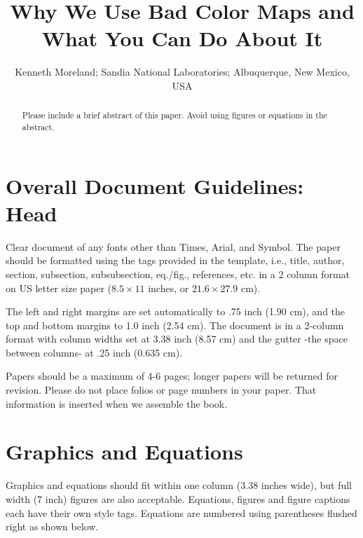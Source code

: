 \documentclass[letterpaper,twocolumn,fleqn]{article}
\title{Why We Use Bad Color Maps and What You Can Do About It}
\author{Kenneth Moreland; Sandia National Laboratories; Albuquerque, New
  Mexico, USA}
\date{} %
\begin{document}
 

\maketitle 

\thispagestyle{empty} %


\begin{abstract}
Please include a brief abstract of this paper. Avoid using figures or
equations in the abstract.
\end{abstract}


\section{Overall Document Guidelines: Head}
\label{sec:intro}

Clear document of any fonts other than Times, Arial, and Symbol. The
paper should be formatted using the tags provided in the template,
i.e., title, author, section, subsection, subsubsection, eq./fig.,
references, etc.  in a 2 column format on US letter size paper ($8.5
\times 11$ inches, or $21.6 \times 27.9$ cm).

The left and right margins are set automatically to .75 inch (1.90 cm),
and the top and bottom margins to 1.0 inch (2.54 cm). The document is in
a 2-column format with column widths set at 3.38 inch (8.57 cm) and the
gutter -the space between columns- at .25 inch (0.635 cm).

Papers should be a maximum of 4-6 pages; longer papers will be
returned for revision. Please do not place folios or page numbers in
your paper. That information is inserted when we assemble the book.


\section{Graphics and Equations}
Graphics and equations should fit within one column (3.38 inches
wide), but full width (7 inch) figures are also acceptable. Equations,
figures and figure captions each have their own style tags. Equations
are numbered using parentheses flushed right as shown below.
\end{document}
